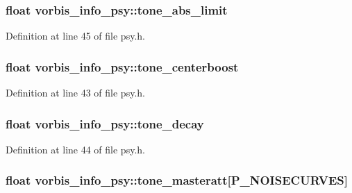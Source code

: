 \subsubsection[{\texorpdfstring{tone\+\_\+abs\+\_\+limit}{tone_abs_limit}}]{\setlength{\rightskip}{0pt plus 5cm}float vorbis\+\_\+info\+\_\+psy\+::tone\+\_\+abs\+\_\+limit}\hypertarget{structvorbis__info__psy_adea96fad862c5291d520454d6a029876}{}\label{structvorbis__info__psy_adea96fad862c5291d520454d6a029876}


Definition at line 45 of file psy.\+h.

\subsubsection[{\texorpdfstring{tone\+\_\+centerboost}{tone_centerboost}}]{\setlength{\rightskip}{0pt plus 5cm}float vorbis\+\_\+info\+\_\+psy\+::tone\+\_\+centerboost}\hypertarget{structvorbis__info__psy_acc3f82d8c41c63e6e35d2cb451d72069}{}\label{structvorbis__info__psy_acc3f82d8c41c63e6e35d2cb451d72069}


Definition at line 43 of file psy.\+h.

\subsubsection[{\texorpdfstring{tone\+\_\+decay}{tone_decay}}]{\setlength{\rightskip}{0pt plus 5cm}float vorbis\+\_\+info\+\_\+psy\+::tone\+\_\+decay}\hypertarget{structvorbis__info__psy_ac10d4f96b564c11d017a2403f23914d9}{}\label{structvorbis__info__psy_ac10d4f96b564c11d017a2403f23914d9}


Definition at line 44 of file psy.\+h.

\subsubsection[{\texorpdfstring{tone\+\_\+masteratt}{tone_masteratt}}]{\setlength{\rightskip}{0pt plus 5cm}float vorbis\+\_\+info\+\_\+psy\+::tone\+\_\+masteratt\mbox{[}{\bf P\+\_\+\+N\+O\+I\+S\+E\+C\+U\+R\+V\+ES}\mbox{]}}\hypertarget{structvorbis__info__psy_a254bb09eb0de3cf794063ad1102b7a8c}{}\label{structvorbis__info__psy_a254bb09eb0de3cf794063ad1102b7a8c}


